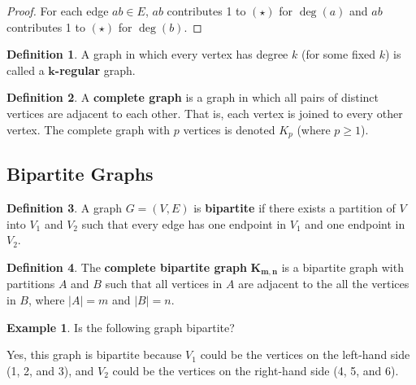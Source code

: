 \documentclass[]{article}
\theoremstyle{definition}
\newtheorem*{defn}{Definition}
\newtheorem{ex}{Example}[section]
\begin{document}
			\begin{proof}
				For each edge $ab \in E$, $ab$ contributes 1 to $(\star)$ for $\deg(a)$ and $ab$ contributes 1 to $(\star)$ for $\deg(b)$.
			\end{proof}

			\begin{defn}
				A graph in which every vertex has degree $k$ (for some fixed $k$) is called a \textbf{$\boldsymbol{k}$-regular} graph.
			\end{defn}
			
			\begin{defn}
				A \textbf{complete graph} is a graph in which all pairs of distinct vertices are adjacent to each other. That is, each vertex is joined to every other vertex. The complete graph with $p$ vertices is denoted $K_p$ (where $p \ge 1$).
			\end{defn}

		\subsection{Bipartite Graphs}
			\begin{defn}
				A graph $G = (V, E)$ is \textbf{bipartite} if there exists a partition of $V$ into $V_1$ and $V_2$ such that every edge has one endpoint in $V_1$ and one endpoint in $V_2$.
			\end{defn}

			\begin{defn}
				The \textbf{complete bipartite graph} $\boldsymbol{K_{m,n}}$ is a bipartite graph with partitions $A$ and $B$ such that all vertices in $A$ are adjacent to the all the vertices in $B$, where $|A| = m$ and $|B| = n$.
			\end{defn}

			\begin{ex}
				Is the following graph bipartite?
				\begin{center}
				\end{center}
				Yes, this graph is bipartite because $V_1$ could be the vertices on the left-hand side (1, 2, and 3), and $V_2$ could be the vertices on the right-hand side (4, 5, and 6).
			\end{ex}
\end{document}
